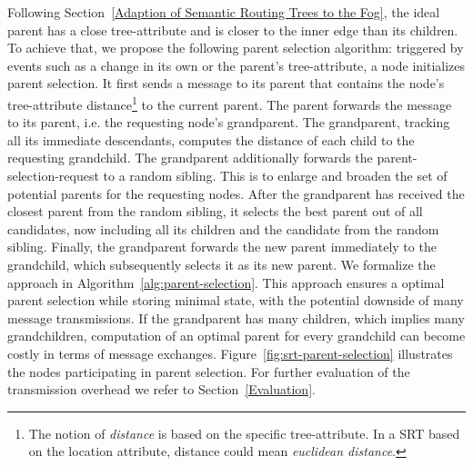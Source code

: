   Following Section~\ref{Adaption of Semantic Routing Trees to the Fog}, the ideal parent has a close tree-attribute and is closer to the inner edge than its children. To achieve that, we propose the following parent selection algorithm: triggered by events such as a change in its own or the parent’s tree-attribute, a node initializes parent selection. It first sends a message to its parent that contains the node’s tree-attribute distance\footnote{The notion of \textit{distance} is based on the specific tree-attribute. In a SRT based on the location attribute, distance could mean \textit{euclidean distance}.} to the current parent. The parent forwards the message to its parent, i.e. the requesting node’s grandparent. The grandparent, tracking all its immediate descendants, computes the distance of each child to the requesting grandchild. The grandparent additionally forwards the parent-selection-request to a random sibling. This is to enlarge and broaden the set of potential parents for the requesting nodes. After the grandparent has received the closest parent from the random sibling, it selects the best parent out of all candidates, now including all its children and the candidate from the random sibling. Finally, the grandparent forwards the new parent immediately to the grandchild, which subsequently selects it as its new parent. We formalize the approach in Algorithm~\ref{alg:parent-selection}. This approach ensures a optimal parent selection while storing minimal state, with the potential downside of many message transmissions. If the grandparent has many children, which implies many grandchildren, computation of an optimal parent for every grandchild can become costly in terms of message exchanges. Figure~\ref{fig:srt-parent-selection} illustrates the nodes participating in parent selection. For further evaluation of the transmission overhead we refer to Section~\ref{Evaluation}.
  
